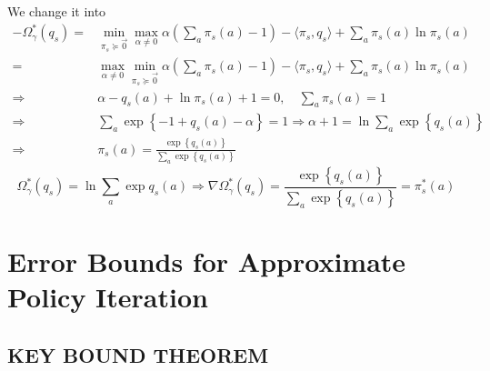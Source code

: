 \documentclass[a4paper]{article}
\begin{document}
We change it into 
\begin{align*}
    -\Omega^{*}_{\gamma}(q_s) =& \min_{\pi_{s} \succeq \vec{0}} \max_{\alpha \ne 0} \alpha \left(\sum^{}_{a} \pi_s(a) - 1 \right)-\langle \pi_s, q_s \rangle + \sum^{}_{a} \pi_s(a) \ln \pi_s(a)\\
    =& \max_{\alpha \ne 0} \min_{\pi_s \succeq \vec{0}} \alpha \left(\sum^{}_{a} \pi_s(a) - 1 \right)-\langle \pi_s, q_s \rangle + \sum^{}_{a} \pi_s(a) \ln \pi_s(a)\\
    \Rightarrow&  \alpha - q_s(a) + \ln \pi_{s}(a) + 1 = 0,\quad \sum^{}_{a} \pi_{s}(a) = 1 \\
    \Rightarrow& \sum^{}_{a} \exp\left\{ -1 + q_{s}(a) - \alpha \right\} = 1
    \Rightarrow \alpha + 1 = \ln \sum^{}_{a} \exp\left\{ q_s(a) \right\}\\
    \Rightarrow& \pi_s(a) = \frac{\exp \left\{q_{s}(a) \right\}}{\sum^{}_{a} \exp\left\{ q_s(a) \right\}} 
\end{align*}
\[
    \Omega^{*}_{\gamma}(q_s) = \ln \sum^{}_{a} \exp q_s(a) \Rightarrow \nabla \Omega^*_{\gamma}(q_s) = \frac{\exp\left\{ q_s(a) \right\}}{ \sum^{}_{a} \exp\left\{ q_s(a) \right\}} = \pi^*_s(a)
\]

\section{Error Bounds for Approximate Policy Iteration}%

\subsection{KEY BOUND THEOREM}%
\end{document}
